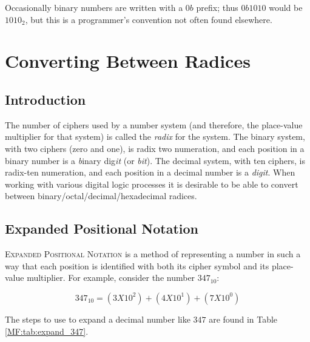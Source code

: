 Occasionally binary numbers are written with a $ 0b $ prefix; thus $ 0b1010 $ would be $ 1010_{2} $, but this is a programmer's convention not often found elsewhere.

\section{Converting Between Radices}
\label{MF:sec:converting_between_bases}

\subsection{Introduction}
\label{MF:sub:introduction_converting_between_bases}

The number of ciphers used by a number system (and therefore, the place-value multiplier for that system) is called the \emph{radix} for the system. The binary system, with two ciphers (zero and one), is radix two numeration, and each position in a binary number is a \emph{b}inary dig\emph{it} (or \emph{bit}). The decimal system, with ten ciphers, is radix-ten numeration, and each position in a decimal number is a \emph{digit}. When working with various digital logic processes it is desirable to be able to convert between binary/octal/decimal/hexadecimal radices.

\subsection{Expanded Positional Notation}
\label{MF:sub:expanded_positional_notation}
\textsc{Expanded Positional Notation} is a method of representing a number in such a way that each position is identified with both its cipher symbol and its place-value multiplier. For example, consider the number $ 347_{10} $:

\begin{equation}
347_{10}=(3X10^2)+(4X10^1)+(7X10^0)
\end{equation}

The steps to use to expand a decimal number like $ 347 $ are found in Table \ref{MF:tab:expand_347}.

